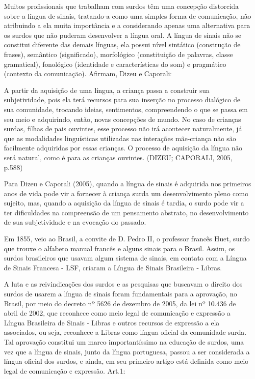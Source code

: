 \documentclass[brasil]{abnt}
\begin{document}
		Muitos profissionais que trabalham com surdos têm uma concepção distorcida sobre a língua de sinais, tratando-a como uma simples forma de comunicação, não atribuindo a ela muita importância e a 
		considerando apenas uma alternativa para os surdos que não puderam desenvolver a língua oral. A língua de sinais não se constitui diferente das demais línguas, ela possui nível sintático 
		(construção de frases), semântico (significado), morfológico (constituição de palavras, classe gramatical), fonológico (identidade e características do som) e pragmático (contexto da comunicação). 
		Afirmam, Dizeu e Caporali:
			
				\begin{citacao}A partir da aquisição de uma língua, a criança passa a construir sua subjetividade, pois ela terá recursos para sua inserção no processo dialógico de sua comunidade, trocando 
								ideias, sentimentos, compreendendo o que se passa em seu meio e adquirindo, então, novas concepções de mundo. No caso de crianças surdas, filhas de pais ouvintes, esse processo 
								não irá acontecer naturalmente, já que as modalidades linguísticas utilizadas nas interações mãe-criança não são facilmente adquiridas por essas crianças. O processo de 
								aquisição da língua não será natural, como é para as crianças ouvintes. (DIZEU; CAPORALI, 2005, p.588)
				\end{citacao}
					
		Para Dizeu e Caporali (2005), quando a língua de sinais é adquirida nos primeiros anos de vida pode vir a fornecer à criança surda um desenvolvimento pleno como sujeito, mas, quando a aquisição da 
		língua de sinais é tardia, o surdo pode vir a ter dificuldades na compreensão de um pensamento abstrato, no desenvolvimento de sua subjetividade e na evocação do passado.
					
		Em 1855, veio ao Brasil, a convite de D. Pedro II, o professor francês Huet, surdo que trouxe o alfabeto manual francês e alguns sinais para o Brasil. Assim, os surdos brasileiros que 
		usavam algum sistema de sinais, em contato com a Língua de Sinais Francesa - LSF, criaram a Língua de Sinais Brasileira - Libras. 
		
		A luta e as reivindicações dos surdos e as pesquisas que buscavam o direito dos surdos de usarem a língua de sinais foram fundamentais para a aprovação, no Brasil, por meio do decreto nº 5626 de dezembro de 2005,
		da lei nº 10.436 de abril de 2002, que reconhece como meio legal de comunicação e expressão a Língua Brasileira de Sinais - Libras e outros recursos de expressão a ela associados, ou seja, reconhece a Libras 
		como língua oficial da comunidade surda. Tal aprovação constitui um marco importantíssimo na educação de surdos, uma vez que a língua de sinais, junto da língua portuguesa, passou a ser considerada a 
		língua oficial dos surdos, e ainda, em seu primeiro artigo está definida como meio legal de comunicação e expressão. Art.1:
			
\end{document}
